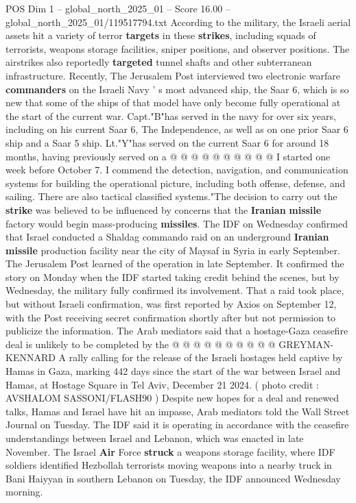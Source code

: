 \begin{textsample}{POS Dim 1 – global\_north\_2025\_01 – Score 16.00 – global\_north\_2025\_01/119517794.txt}
According to the military, the Israeli aerial assets hit a variety of terror \textbf{targets} in these \textbf{strikes}, including squads of terrorists, weapons storage facilities, sniper positions, and observer positions.
The airstrikes also reportedly \textbf{targeted} tunnel shafts and other subterranean infrastructure.
Recently, The Jerusalem Post interviewed two electronic warfare \textbf{commanders} on the Israeli Navy ' s most advanced ship, the Saar 6, which is so new that some of the ships of that model have only become fully operational at the start of the current war.
Capt."B"has served in the navy for over six years, including on his current Saar 6, The Independence, as well as on one prior Saar 6 ship and a Saar 5 ship.
Lt."Y"has served on the current Saar 6 for around 18 months, having previously served on a @ @ @ @ @ @ @ @ @ @ I started one week before October 7.
I commend the detection, navigation, and communication systems for building the operational picture, including both offense, defense, and sailing.
There are also tactical classified systems."The decision to carry out the \textbf{strike} was believed to be influenced by concerns that the \textbf{Iranian} \textbf{missile} factory would begin mass-producing \textbf{missiles}.
The IDF on Wednesday confirmed that Israel conducted a Shaldag commando raid on an underground \textbf{Iranian} \textbf{missile} production facility near the city of Maysaf in Syria in early September.
The Jerusalem Post learned of the operation in late September.
It confirmed the story on Monday when the IDF started taking credit behind the scenes, but by Wednesday, the military fully confirmed its involvement.
That a raid took place, but without Israeli confirmation, was first reported by Axios on September 12, with the Post receiving secret confirmation shortly after but not permission to publicize the information.
The Arab mediators said that a hostage-Gaza ceasefire deal is unlikely to be completed by the @ @ @ @ @ @ @ @ @ @ GREYMAN-KENNARD A rally calling for the release of the Israeli hostages held captive by Hamas in Gaza, marking 442 days since the start of the war between Israel and Hamas, at Hostage Square in Tel Aviv, December 21 2024. ( photo credit : AVSHALOM SASSONI/FLASH90 ) Despite new hopes for a deal and renewed talks, Hamas and Israel have hit an impasse, Arab mediators told the Wall Street Journal on Tuesday.
The IDF said it is operating in accordance with the ceasefire understandings between Israel and Lebanon, which was enacted in late November.
The Israel \textbf{Air} Force \textbf{struck} a weapons storage facility, where IDF soldiers identified Hezbollah terrorists moving weapons into a nearby truck in Bani Haiyyan in southern Lebanon on Tuesday, the IDF announced Wednesday morning.

\end{textsample}
